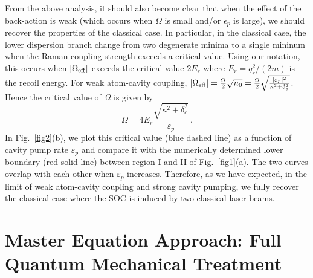 \documentclass[atoms,article,submit,moreauthors,pdftex,12pt,a4paper]{mdpi}
\begin{document}
From the above analysis, it should also become clear that when the effect of the back-action is weak (which occurs when $\Omega$ is small and/or $\epsilon_p$ is large), we should recover the properties of the classical case. In particular, in the classical case, the lower dispersion branch change from two degenerate minima to a single mininum when the Raman coupling strength exceeds a critical value. Using our notation, this occurs when $|\Omega_{\rm eff}|$ exceeds the critical value $2E_r$ where $E_r=q_r^2/(2m)$ is the recoil energy. For weak atom-cavity coupling, $|\Omega_{\rm eff}| =\frac{ \Omega}{2} \sqrt{n_0}=\frac{\Omega}{2} \sqrt{ \frac{|\varepsilon_p|^2}{\kappa^2+ \delta_c^2}}$. Hence the critical value of $\Omega$ is given by 
\begin{equation}
\Omega=4E_r\frac{\sqrt{\kappa^2+\delta_c^2}}{\varepsilon_p}\,.
\label{ome}
\end{equation}
In Fig.~\ref{fig2}(b), we plot this critical value (blue dashed line) as a function of cavity pump rate $\varepsilon_p$ and compare it with the numerically determined lower boundary (red solid line) between region I and II of Fig.~\ref{fig1}(a). The two curves overlap with each other when $\varepsilon_p$ increases. Therefore, as we have expected, in the limit of weak atom-cavity coupling and strong cavity pumping, we fully recover the classical case where the SOC is induced by two classical laser beams.     


\section{Master Equation Approach: Full Quantum Mechanical Treatment } \label{master}
\end{document}
